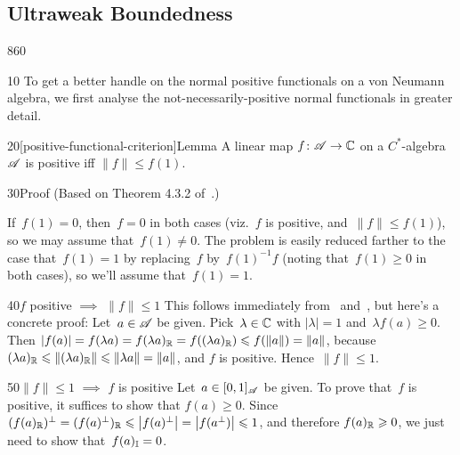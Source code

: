 \subsection{Ultraweak Boundedness}
\begin{parsec}{860}%
\begin{point}{10}%
To get a better handle on the normal positive functionals
on a von Neumann algebra,
we first analyse  the not-necessarily-positive normal functionals
in greater detail.
\end{point}
\begin{point}{20}[positive-functional-criterion]{Lemma}%
A linear map $f\colon \mathscr{A}\to \mathbb{C}$
on a $C^*$-algebra~$\mathscr{A}$
is positive iff $\|f\|\leq f(1)$.
\begin{point}{30}{Proof}%
(Based on Theorem 4.3.2 of~\cite{kr}.)

If~$f(1)=0$, then~$f=0$ in both cases 
(viz.~$f$ is positive, and~$\|f\|\leq f(1)$),
so
we may assume that~$f(1)\neq 0$.
The problem is easily reduced farther to the case 
that~$f(1)=1$
by replacing~$f$ by~$f(1)^{-1}f$
(noting that~$f(1)\geq 0$ in both cases),
so we'll assume that~$f(1)=1$.

\begin{point}{40}{$f$ positive $\implies$ $\|f\|\leq 1$}%
This follows
immediately from~ and~,
but here's a concrete proof:
Let~$a\in \mathscr{A}$ be given.
Pick~$\lambda\in \mathbb{C}$ with $\left|\lambda\right|=1$
and~$\lambda f(a)\geq 0$.
Then $\left|f(a)\right|=f(\lambda a) 
= f(\lambda a)_{\mathbb{R}}
= f((\lambda a)_{\mathbb{R}})
\leqslant f(\|a\|)=\|a\|$,
because $(\lambda a)_{\mathbb{R}}
\leqslant \|(\lambda a)_{\mathbb{R}}\|
\leqslant \|\lambda a\|=\|a\|$,
and $f$ is positive.
Hence~$\|f\|\leq 1$.
\end{point}
\begin{point}{50}{$\|f\|\leq 1$ $\implies$ $f$ is positive}%
Let~$a\in [0,1]_{\mathscr{A}}$ be given.
To prove that~$f$ is positive, it suffices to show that $f(a)\geq 0$.
Since $(f(a)_{\mathbb{R}})^\perp
=(f(a)^\perp)_{\mathbb{R}}
\leqslant \left|f(a)^\perp \right|
=\left|f(a^\perp)\right|\leqslant 1$,
and therefore $f(a)_{\mathbb{R}}\geqslant 0$,
we just need to show that~$f(a)_{\mathbb{I}}=0$.


\end{point}
\end{point}
\end{point}
\end{parsec}
